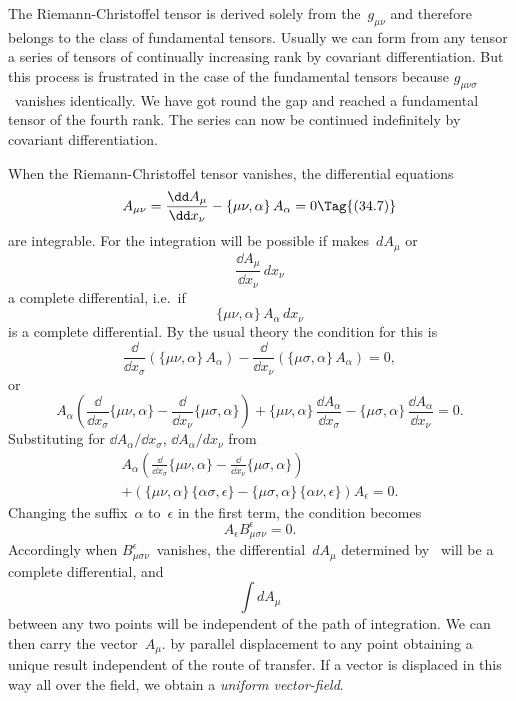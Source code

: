 \documentclass[12pt]{book}
\begin{document}
The Riemann\hyp{}Christoffel tensor is derived solely from the~$g_{\mu\nu}$ and therefore
belongs to the class of fundamental tensors. Usually we can form from
any tensor a series of tensors of continually increasing rank by covariant
differentiation. But this process is frustrated in the case of the fundamental
tensors because $g_{\mu\nu\sigma}$~vanishes identically. We have got round the gap and
reached a fundamental tensor of the fourth rank. The series can now be continued
indefinitely by covariant differentiation.

When the Riemann\hyp{}Christoffel tensor vanishes, the differential equations
%
%
\[
A_{\mu\nu} = \frac{\dd A_{\mu}}{\dd x_{\nu}} - \{\mu\nu, \alpha\}\, A_{\alpha} = 0
\Tag{(34.7)}
\]
are integrable. For the integration will be possible if  makes~$dA_{\mu}$ or
\[
\frac{\dd A_{\mu}}{\dd x_{\nu}}\, dx_{\nu}
\]
a complete differential, i.e.\ if
\[
\{\mu\nu, \alpha\}\, A_{\alpha}\, dx_{\nu}
\]
is a complete differential. By the usual theory the condition for this is
\[
\frac{\dd}{\dd x_{\sigma}} (\{\mu\nu, \alpha\}\, A_{\alpha})
- \frac{\dd}{\dd x_{\nu}} (\{\mu\sigma, \alpha\}\, A_{\alpha}) = 0,
\]
or
\[
A_{\alpha} \left(\frac{\dd}{\dd x_{\sigma}} \{\mu\nu, \alpha\}
             - \frac{\dd}{\dd x_{\nu}} \{\mu\sigma, \alpha\}\right)
+ \{\mu\nu, \alpha\}\, \frac{\dd A_{\alpha}}{\dd x_{\sigma}}
- \{\mu\sigma, \alpha\}\, \frac{\dd A_{\alpha}}{\dd x_{\nu}} = 0.
\]
Substituting for $\dd A_{\alpha}/\dd x_{\sigma}$, $\dd A_{\alpha}/dx_{\nu}$ from~
\begin{multline*}
A_{\alpha} \left(\frac{\dd}{\dd x_{\sigma}} \{\mu\nu, \alpha\}
             - \frac{\dd}{\dd x_{\nu}} \{\mu\sigma, \alpha\}\right) \\
+ (\{\mu\nu, \alpha\}\, \{\alpha\sigma, \epsilon\}
- \{\mu\sigma, \alpha\}\, \{\alpha\nu, \epsilon\}) A_{\epsilon} = 0.
\end{multline*}
Changing the suffix~$\alpha$ to~$\epsilon$ in the first term, the condition becomes
\[
A_{\epsilon} B_{\mu\sigma\nu}^{\epsilon} = 0.
\]
Accordingly when $B_{\mu\sigma\nu}^{\epsilon}$~vanishes, the differential~$dA_{\mu}$ determined by~
will be a complete differential, and
\[
\int dA_{\mu}
\]
between any two points will be independent of the path of integration. We
can then carry the vector~$A_{\mu}$. by parallel displacement to any point obtaining
a unique result independent of the route of transfer. If a vector is displaced
in this way all over the field, we obtain a \emph{uniform vector\hyp{}field}.
%
\end{document}
